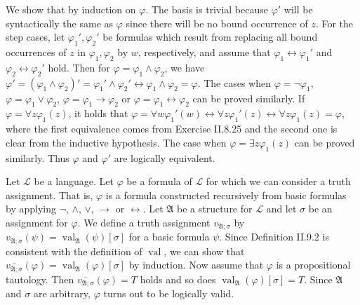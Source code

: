 \documentclass[12pt]{article}
\newcommand{\val}{\mathop{\mathrm{val}}}
\theoremstyle{definition}
\newenvironment{customthm}[1]
  {\renewcommand\theinnercustomthm{#1}\innercustomthm}
  {\endinnercustomthm}
\begin{document}
\begin{customthm}{II.8.26} We show that by induction on $\varphi$. The basis is trivial because $\varphi'$ will be syntactically the same as $\varphi$ since there will be no bound occurrence of $z$. For the step cases, let $\varphi_1',\varphi_2'$ be formulas which result from replacing all bound occurrences of $z$ in $\varphi_1,\varphi_2$ by $w$, respectively, and assume that $\varphi_1\leftrightarrow\varphi_1'$ and $\varphi_2\leftrightarrow\varphi_2'$ hold. Then for $\varphi=\varphi_1\wedge\varphi_2$, we have $\varphi'=(\varphi_1\wedge\varphi_2)'=\varphi_1'\wedge\varphi_2'\leftrightarrow\varphi_1\wedge\varphi_2=\varphi$. The cases when $\varphi=\neg\varphi_1$, $\varphi=\varphi_1\vee\varphi_2$, $\varphi=\varphi_1\rightarrow\varphi_2$ or $\varphi=\varphi_1\leftrightarrow\varphi_2$ can be proved similarly. If $\varphi=\forall z\varphi_1(z)$, it holds that $\varphi=\forall w\varphi_1'(w)\leftrightarrow\forall z\varphi_1'(z)\leftrightarrow\forall z\varphi_1(z)=\varphi$, where the first equivalence comes from Exercise II.8.25 and the second one is clear from the inductive hypothesis. The case when $\varphi=\exists z\varphi_1(z)$ can be proved similarly. Thus $\varphi$ and $\varphi'$ are logically equivalent.
\end{customthm}

\begin{customthm}{II.9.3} Let $\mathcal{L}$ be a language. Let $\varphi$ be a formula of $\mathcal{L}$ for which we can consider a truth assignment. That is, $\varphi$ is a formula constructed recursively from basic formulas by applying $\neg$, $\wedge$, $\vee$, $\rightarrow$ or $\leftrightarrow$. Let $\mathfrak{A}$ be a structure for $\mathcal{L}$ and let $\sigma$ be an assignment for $\varphi$. We define a truth assignment $v_{\mathfrak{A};\sigma}$ by $v_{\mathfrak{A};\sigma}(\psi)=\val_\mathfrak{A}(\psi)[\sigma]$ for a basic formula $\psi$. Since Definition II.9.2 is consistent with the definition of $\val$, we can show that $\overline{v_{\mathfrak{A};\sigma}}(\varphi)=\val_\mathfrak{A}(\varphi)[\sigma]$ by induction. Now assume that $\varphi$ is a propositional tautology. Then $\overline{v_{\mathfrak{A};\sigma}}(\varphi)=T$ holds and so does $\val_\mathfrak{A}(\varphi)[\sigma]=T$. Since $\mathfrak{A}$ and $\sigma$ are arbitrary, $\varphi$ turns out to be logically valid.
\end{customthm}
\end{document}
